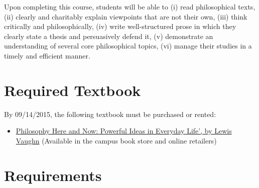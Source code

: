 \documentclass[11pt,article,oneside]{memoir}
\begin{document}
Upon completing this course, students will be able to (i) read
philosophical texts, (ii) clearly and charitably explain viewpoints that
are not their own, (iii) think critically and philosophically, (iv)
write well-structured prose in which they clearly state a thesis and
persuasively defend it, (v) demonstrate an understanding of several core
philosophical topics, (vi) manage their studies in a timely and efficient manner.

\section{Required Textbook}

By 09/14/2015, the following textbook must be purchased or rented:

\begin{itemize}
\item
  \href{http://www.amazon.com/Philosophy-Here-Now-Powerful-Everyday/dp/0199765227}{Philosophy
  Here and Now: Powerful Ideas in Everyday Life', by Lewis Vaughn}
  (Available in the campus book store and online retailers)
\end{itemize}

\section{Requirements}
\end{document}
